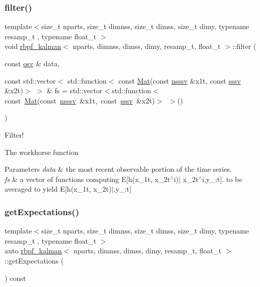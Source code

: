 \subsubsection{\texorpdfstring{filter()}{filter()}}
{\footnotesize\ttfamily template$<$size\+\_\+t nparts, size\+\_\+t dimnss, size\+\_\+t dimss, size\+\_\+t dimy, typename resamp\+\_\+t , typename float\+\_\+t $>$ \\
void \hyperlink{classrbpf__kalman}{rbpf\+\_\+kalman}$<$ nparts, dimnss, dimss, dimy, resamp\+\_\+t, float\+\_\+t $>$\+::filter (\begin{DoxyParamCaption}\item[{const \hyperlink{classrbpf__kalman_ae6e59c034c1b0abc7871887ae088055e}{osv} \&}]{data,  }\item[{const std\+::vector$<$ std\+::function$<$ const \hyperlink{classrbpf__kalman_a736704f31949e04f537aa8b7263e44af}{Mat}(const \hyperlink{classrbpf__kalman_aea6e6dd087b2fca63be4e480dcf0d1c3}{nsssv} \&x1t, const \hyperlink{classrbpf__kalman_a616e56c08c1a6b476e065b2200433915}{sssv} \&x2t)$>$ $>$ \&}]{fs = {\ttfamily std\+:\+:vector$<$std\+:\+:function$<$const~\hyperlink{classrbpf__kalman_a736704f31949e04f537aa8b7263e44af}{Mat}(const~\hyperlink{classrbpf__kalman_aea6e6dd087b2fca63be4e480dcf0d1c3}{nsssv}~\&x1t,~const~\hyperlink{classrbpf__kalman_a616e56c08c1a6b476e065b2200433915}{sssv}~\&x2t)$>$~$>$()} }\end{DoxyParamCaption})}



Filter! 

The workhorse function 
\begin{DoxyParams}{Parameters}
{\em data} & the most recent observable portion of the time series. \\
\hline
{\em fs} & a vector of functions computing E\mbox{[}h(x\+\_\+1t, x\+\_\+2t$^\wedge$i)$\vert$ x\+\_\+2t$^\wedge$i,y\+\_\+:t\mbox{]}. to be averaged to yield E\mbox{[}h(x\+\_\+1t, x\+\_\+2t)$\vert$,y\+\_\+:t\mbox{]} \\
\hline
\end{DoxyParams}
\mbox{\label{classrbpf__kalman_a14b715a91d8b8f8bd24946dacc449b18}} 
\subsubsection{\texorpdfstring{get\+Expectations()}{getExpectations()}}
{\footnotesize\ttfamily template$<$size\+\_\+t nparts, size\+\_\+t dimnss, size\+\_\+t dimss, size\+\_\+t dimy, typename resamp\+\_\+t , typename float\+\_\+t $>$ \\
auto \hyperlink{classrbpf__kalman}{rbpf\+\_\+kalman}$<$ nparts, dimnss, dimss, dimy, resamp\+\_\+t, float\+\_\+t $>$\+::get\+Expectations (\begin{DoxyParamCaption}{ }\end{DoxyParamCaption}) const}



